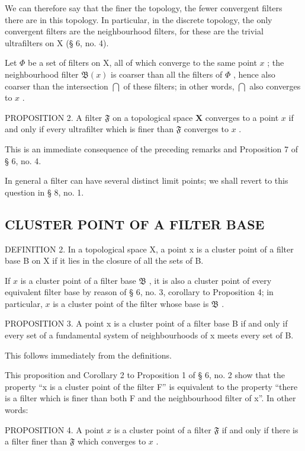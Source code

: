 We can therefore say that the finer the topology, the fewer convergent filters there are in this topology. In particular, in the discrete topology, the only convergent filters are the neighbourhood filters, for these are the trivial ultrafilters on X (§ 6, no. 4).

Let \(\Phi\) be a set of filters on X, all of which converge to the same point \(x\) ; the neighbourhood filter \(\mathfrak{B}(x)\) is coarser than all the filters of \(\Phi\) , hence also coarser than the intersection \(\bigcap\) of these filters; in other words, \(\bigcap\) also converges to \(x\) .

PROPOSITION 2. A filter \(\mathfrak{F}\) on a topological space \(\mathbf{X}\) converges to a point \(x\) if and only if every ultrafilter which is finer than \(\mathfrak{F}\) converges to \(x\) .

This is an immediate consequence of the preceding remarks and Proposition 7 of § 6, no. 4.

In general a filter can have several distinct limit points; we shall revert to this question in § 8, no. 1.

\subsection{CLUSTER POINT OF A FILTER BASE}

DEFINITION 2. In a topological space X, a point x is a cluster point of a filter base B on X if it lies in the closure of all the sets of B.

If \(x\) is a cluster point of a filter base \(\mathfrak{B}\) , it is also a cluster point of every equivalent filter base by reason of § 6, no. 3, corollary to Proposition 4; in particular, \(x\) is a cluster point of the filter whose base is \(\mathfrak{B}\) .

PROPOSITION 3. A point x is a cluster point of a filter base B if and only if every set of a fundamental system of neighbourhoods of x meets every set of B.

This follows immediately from the definitions.

This proposition and Corollary 2 to Proposition 1 of § 6, no. 2 show that the property ``x is a cluster point of the filter F'' is equivalent to the property ``there is a filter which is finer than both F and the neighbourhood filter of x''. In other words:

PROPOSITION 4. A point \(x\) is a cluster point of a filter \(\mathfrak{F}\) if and only if there is a filter finer than \(\mathfrak{F}\) which converges to \(x\) .

